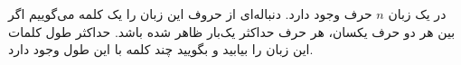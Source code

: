 \EXERCISE
در یک زبان
$n$
حرف وجود دارد. دنباله‌ای از حروف این زبان را یک کلمه می‌گوییم اگر بین هر دو حرف یکسان، هر حرف حداکثر یک‌بار ظاهر شده باشد. حداکثر طول کلمات این زبان را بیابید و بگویید چند کلمه با این طول وجود دارد.